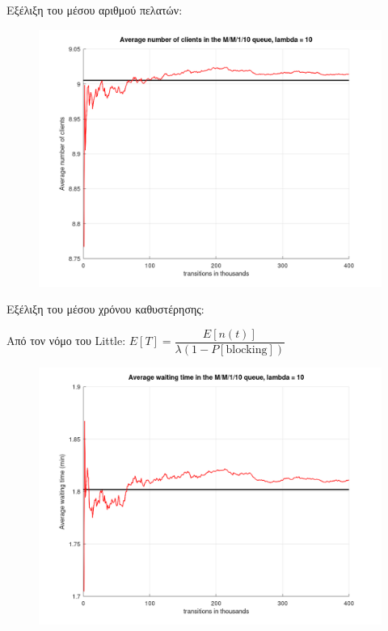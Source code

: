 \documentclass[a4paper]{article}
\begin{document}
\begin{minipage}{\textwidth}
Εξέλιξη του μέσου αριθμού πελατών:

\begin{figure}[H]
	\includegraphics[width=\textwidth]{images/clients3.png}
\end{figure}

Εξέλιξη του μέσου χρόνου καθυστέρησης:

Από τον νόμο του Little: $ E[T] = \dfrac{E[n(t)]}{λ(1-P[\text{blocking}])} $

\begin{figure}[H]
	\includegraphics[width=\textwidth]{images/time3.png}
\end{figure}

\end{minipage}
\end{document}
